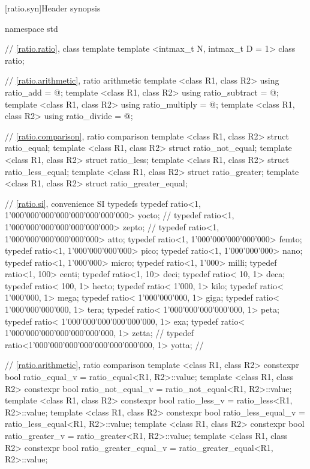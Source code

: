 [ratio.syn]{Header  synopsis}

\begin{codeblockdigitsep}
namespace std {
  // \ref{ratio.ratio}, class template 
  template <intmax_t N, intmax_t D = 1> class ratio;

  // \ref{ratio.arithmetic}, ratio arithmetic
  template <class R1, class R2> using ratio_add = @\seebelow@;
  template <class R1, class R2> using ratio_subtract = @\seebelow@;
  template <class R1, class R2> using ratio_multiply = @\seebelow@;
  template <class R1, class R2> using ratio_divide = @\seebelow@;

  // \ref{ratio.comparison}, ratio comparison
  template <class R1, class R2> struct ratio_equal;
  template <class R1, class R2> struct ratio_not_equal;
  template <class R1, class R2> struct ratio_less;
  template <class R1, class R2> struct ratio_less_equal;
  template <class R1, class R2> struct ratio_greater;
  template <class R1, class R2> struct ratio_greater_equal;

  // \ref{ratio.si}, convenience SI typedefs
  typedef ratio<1, 1'000'000'000'000'000'000'000'000> yocto;  // \seebelow
  typedef ratio<1,     1'000'000'000'000'000'000'000> zepto;  // \seebelow
  typedef ratio<1,         1'000'000'000'000'000'000> atto;
  typedef ratio<1,             1'000'000'000'000'000> femto;
  typedef ratio<1,                 1'000'000'000'000> pico;
  typedef ratio<1,                     1'000'000'000> nano;
  typedef ratio<1,                         1'000'000> micro;
  typedef ratio<1,                             1'000> milli;
  typedef ratio<1,                               100> centi;
  typedef ratio<1,                                10> deci;
  typedef ratio<                               10, 1> deca;
  typedef ratio<                              100, 1> hecto;
  typedef ratio<                            1'000, 1> kilo;
  typedef ratio<                        1'000'000, 1> mega;
  typedef ratio<                    1'000'000'000, 1> giga;
  typedef ratio<                1'000'000'000'000, 1> tera;
  typedef ratio<            1'000'000'000'000'000, 1> peta;
  typedef ratio<        1'000'000'000'000'000'000, 1> exa;
  typedef ratio<    1'000'000'000'000'000'000'000, 1> zetta;  // \seebelow
  typedef ratio<1'000'000'000'000'000'000'000'000, 1> yotta;  // \seebelow

  // \ref{ratio.arithmetic}, ratio comparison
  template <class R1, class R2> constexpr bool ratio_equal_v
    = ratio_equal<R1, R2>::value;
  template <class R1, class R2> constexpr bool ratio_not_equal_v
    = ratio_not_equal<R1, R2>::value;
  template <class R1, class R2> constexpr bool ratio_less_v
    = ratio_less<R1, R2>::value;
  template <class R1, class R2> constexpr bool ratio_less_equal_v
    = ratio_less_equal<R1, R2>::value;
  template <class R1, class R2> constexpr bool ratio_greater_v
    = ratio_greater<R1, R2>::value;
  template <class R1, class R2> constexpr bool ratio_greater_equal_v
    = ratio_greater_equal<R1, R2>::value;
}
\end{codeblockdigitsep}

